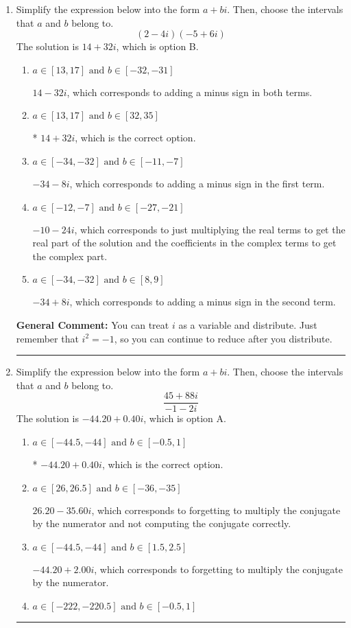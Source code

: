 \documentclass{extbook}[14pt]
\newcommand{\litem}[1]{\item #1

\rule{\textwidth}{0.4pt}}
\begin{document}
\begin{enumerate}\litem{
Simplify the expression below into the form $a+bi$. Then, choose the intervals that $a$ and $b$ belong to.
\[ (2 - 4 i)(-5 + 6 i) \]
The solution is \( 14 + 32 i \), which is option B.\begin{enumerate}[label=\Alph*.]
\item \( a \in [13, 17] \text{ and } b \in [-32, -31] \)

 $14 - 32 i$, which corresponds to adding a minus sign in both terms.
\item \( a \in [13, 17] \text{ and } b \in [32, 35] \)

* $14 + 32 i$, which is the correct option.
\item \( a \in [-34, -32] \text{ and } b \in [-11, -7] \)

 $-34 - 8 i$, which corresponds to adding a minus sign in the first term.
\item \( a \in [-12, -7] \text{ and } b \in [-27, -21] \)

 $-10 - 24 i$, which corresponds to just multiplying the real terms to get the real part of the solution and the coefficients in the complex terms to get the complex part.
\item \( a \in [-34, -32] \text{ and } b \in [8, 9] \)

 $-34 + 8 i$, which corresponds to adding a minus sign in the second term.
\end{enumerate}

\textbf{General Comment:} You can treat $i$ as a variable and distribute. Just remember that $i^2=-1$, so you can continue to reduce after you distribute.
}
\litem{
Simplify the expression below into the form $a+bi$. Then, choose the intervals that $a$ and $b$ belong to.
\[ \frac{45 + 88 i}{-1 - 2 i} \]
The solution is \( -44.20  + 0.40 i \), which is option A.\begin{enumerate}[label=\Alph*.]
\item \( a \in [-44.5, -44] \text{ and } b \in [-0.5, 1] \)

* $-44.20  + 0.40 i$, which is the correct option.
\item \( a \in [26, 26.5] \text{ and } b \in [-36, -35] \)

 $26.20  - 35.60 i$, which corresponds to forgetting to multiply the conjugate by the numerator and not computing the conjugate correctly.
\item \( a \in [-44.5, -44] \text{ and } b \in [1.5, 2.5] \)

 $-44.20  + 2.00 i$, which corresponds to forgetting to multiply the conjugate by the numerator.
\item \( a \in [-222, -220.5] \text{ and } b \in [-0.5, 1] \)


\end{enumerate}}
\end{enumerate}
\end{document}
